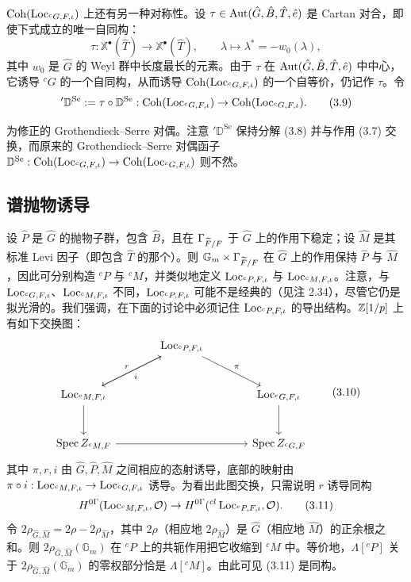 $\operatorname{Coh}(\operatorname{Loc}_{{}^{c}G,F,\iota})$ 上还有另一种对称性。设 $\tau\in\operatorname{Aut}(\hat G,\hat B,\hat T,\hat e)$ 是 Cartan 对合，即使下式成立的唯一自同构：
\[
\tau:\mathbb X^{\bullet}(\hat T)\to\mathbb X^{\bullet}(\hat T),\qquad \lambda\mapsto\lambda^{*}=-w_0(\lambda),
\]
其中 $w_0$ 是 $\hat G$ 的 Weyl 群中长度最长的元素。由于 $\tau$ 在 $\operatorname{Aut}(\hat G,\hat B,\hat T,\hat e)$ 中中心，它诱导 ${}^cG$ 的一个自同构，从而诱导 $\operatorname{Coh}(\operatorname{Loc}_{{}^{c}G,F,\iota})$ 的一个自等价，仍记作 $\tau$。令
\begin{equation}
{}'\mathbb D^{\mathrm{Se}} := \tau\circ\mathbb D^{\mathrm{Se}}:\operatorname{Coh}(\operatorname{Loc}_{{}^{c}G,F,\iota})\to\operatorname{Coh}(\operatorname{Loc}_{{}^{c}G,F,\iota}). \tag{3.9}
\end{equation}

为修正的 Grothendieck–Serre 对偶。注意 ${}'\mathbb D^{\mathrm{Se}}$ 保持分解 (3.8) 并与作用 (3.7) 交换，而原来的 Grothendieck–Serre 对偶函子 $\mathbb D^{\mathrm{Se}}:\operatorname{Coh}(\operatorname{Loc}_{{}^{c}G,F,\iota})\to\operatorname{Coh}(\operatorname{Loc}_{{}^{c}G,F,\iota})$ 则不然。

\subsection{谱抛物诱导}

设 $\hat P$ 是 $\hat G$ 的抛物子群，包含 $\hat B$，且在 $\Gamma_{\widetilde F/F}$ 于 $\hat G$ 上的作用下稳定；设 $\hat M$ 是其标准 Levi 因子（即包含 $\hat T$ 的那个）。则 $\mathbb G_m\times\Gamma_{\widetilde F/F}$ 在 $\hat G$ 上的作用保持 $\hat P$ 与 $\hat M$，因此可分别构造 ${}^cP$ 与 ${}^cM$，并类似地定义 $\operatorname{Loc}_{{}^{c}P,F,\iota}$ 与 $\operatorname{Loc}_{{}^{c}M,F,\iota}$。注意，与 $\operatorname{Loc}_{{}^{c}G,F,\iota}$、$\operatorname{Loc}_{{}^{c}M,F,\iota}$ 不同，$\operatorname{Loc}_{{}^{c}P,F,\iota}$ 可能不是经典的（见注 2.34），尽管它仍是拟光滑的。我们强调，在下面的讨论中必须记住 $\operatorname{Loc}_{{}^{c}P,F,\iota}$ 的导出结构。$\mathbb{Z}[1/p]$ 上有如下交换图：
\begin{equation}
\begin{tikzcd}[column sep=large,row sep=large]
& \Loc_{{}^{c}P,F,\iota} \arrow[dl, "r"'] \arrow[dr, "\pi"] & \\
\Loc_{{}^{c}M,F,\iota} \arrow[ur, "i"'] \arrow[d] & & \Loc_{{}^{c}G,F,\iota} \arrow[d] \\
\Spec Z_{{}^{c}M,F} \arrow[rr] & & \Spec Z_{{}^{c}G,F}
\end{tikzcd} \tag{3.10}
\end{equation}
其中 $\pi,r,i$ 由 $\hat G,\hat P,\hat M$ 之间相应的态射诱导，底部的映射由 $\pi\circ i:\operatorname{Loc}_{{}^{c}M,F,\iota}\to\operatorname{Loc}_{{}^{c}G,F,\iota}$ 诱导。为看出此图交换，只需说明 $r$ 诱导同构
\begin{equation}
H^{0\Gamma}(\operatorname{Loc}_{{}^{c}M,F,\iota},\mathcal O)\to H^{0\Gamma}({}^{cl}\operatorname{Loc}_{{}^{c}P,F,\iota},\mathcal O). \tag{3.11}
\end{equation}
令 $2\rho_{\hat G,\hat M}=2\rho-2\rho_{\hat M}$，其中 $2\rho$（相应地 $2\rho_{\hat M}$）是 $\hat G$（相应地 $\hat M$）的正余根之和。则 $2\rho_{\hat G,\hat M}(\mathbb G_m)$ 在 ${}^cP$ 上的共轭作用把它收缩到 ${}^cM$ 中。等价地，$\Lambda[{}^cP]$ 关于 $2\rho_{\hat G,\hat M}(\mathbb G_m)$ 的零权部分恰是 $\Lambda[{}^cM]$。由此可见 (3.11) 是同构。

